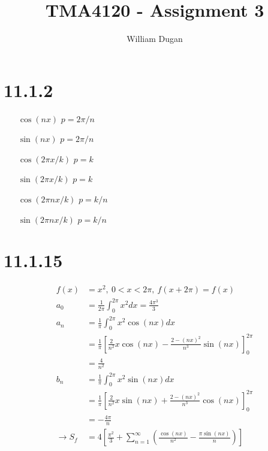 \documentclass[11pt,a4paper]{article}
\begin{document}
\title{TMA4120 - Assignment 3} 
\author{William Dugan}

\maketitle

\section*{11.1.2}
\begin{itemize}[leftmargin=4.0cm,labelsep=0.5cm]
    \item[$\cos(nx)$] $p=2\pi/n$
    \item[$\sin(nx)$] $p=2\pi/n$
    \item[$\cos(2\pi x / k)$] $p=k$
    \item[$\sin(2\pi x / k)$] $p=k$
    \item[$\cos(2\pi nx / k)$] $p=k/n$
    \item[$\sin(2\pi nx / k)$] $p=k/n$
\end{itemize}

\section*{11.1.15}
\begin{align*}
    f(x) &= x^2,\ 0<x<2\pi,\ f(x+2\pi) = f(x)\\
    a_0 &= \frac{1}{2\pi} \int_0^{2\pi}x^2dx = \frac{4\pi^3}{3} \\
    a_n &= \frac{1}{\pi} \int_0^{2\pi} x^2\cos(nx) dx \\
    &= \frac{1}{\pi} \left[
        \frac{2}{n^2}x\cos(nx) - \frac{2-(nx)^2}{n^3}\sin(nx)
    \right]_0^{2\pi} \\
    &= \frac{4}{n^2} \\
    b_n &= \frac{1}{\pi} \int_0^{2\pi} x^2\sin(nx)dx \\
    &= \frac{1}{\pi} \left[
        \frac{2}{n^2}x\sin(nx) + \frac{2-(nx)^2}{n^3}\cos(nx)
    \right]_0^{2\pi} \\
    &= - \frac{4\pi}{n} \\
    \rightarrow S_f 
    &= 4 \left[
        \frac{{\pi^2}}{3} + \sum_{n=1}^\infty \left(
            \frac{\cos(nx)}{n^2} - \frac{\pi\sin(nx)}{n}
        \right)
    \right]
\end{align*}
\end{document}
